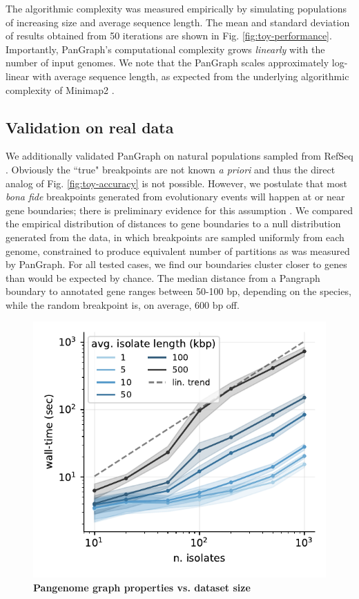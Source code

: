 \documentclass[aps,rmp,reprint,superscriptaddress,notitlepage,10pt]{revtex4-1}
\begin{document}
The algorithmic complexity was measured empirically by simulating populations of increasing size and average sequence length.
The mean and standard deviation of results obtained from 50 iterations are shown in Fig. \ref{fig:toy-performance}.
Importantly, PanGraph's computational complexity grows \emph{linearly} with the number of input genomes.
We note that the PanGraph scales approximately log-linear with average sequence length, as expected from the underlying algorithmic complexity of Minimap2 \cite{li2018minimap2}.

\subsection{Validation on real data}

We additionally validated PanGraph on natural populations sampled from RefSeq \cite{o2016reference}.
Obviously the ``true" breakpoints are not known \emph{a priori} and thus the direct analog of Fig. \ref{fig:toy-accuracy} is not possible.
However, we postulate that most \emph{bona fide} breakpoints generated from evolutionary events will happen at or near gene boundaries; there is preliminary evidence for this assumption \cite{oliveira2017chromosomal}.
We compared the empirical distribution of distances to gene boundaries to a null distribution generated from the data, in which breakpoints are sampled uniformly from each genome, constrained to produce equivalent number of partitions as was measured by PanGraph.
For all tested cases, we find our boundaries cluster closer to genes than would be expected by chance.
The median distance from a Pangraph boundary to annotated gene ranges between 50-100 bp, depending on the species, while the random breakpoint is, on average, 600 bp off.


\begin{figure}[htb]
    \includegraphics[width=.8\textwidth]{figs/incr_size.pdf}
    \caption{{\bf Pangenome graph properties vs. dataset size}}
    \label{fig:panx-size}
\end{figure}
\end{document}
